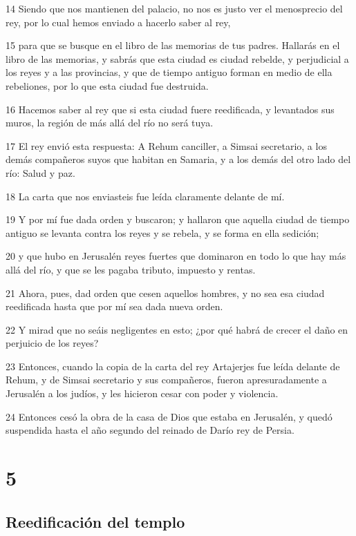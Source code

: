 \par 14 Siendo que nos mantienen del palacio, no nos es justo ver el menosprecio del rey, por lo cual hemos enviado a hacerlo saber al rey,
\par 15 para que se busque en el libro de las memorias de tus padres. Hallarás en el libro de las memorias, y sabrás que esta ciudad es ciudad rebelde, y perjudicial a los reyes y a las provincias, y que de tiempo antiguo forman en medio de ella rebeliones, por lo que esta ciudad fue destruida.
\par 16 Hacemos saber al rey que si esta ciudad fuere reedificada, y levantados sus muros, la región de más allá del río no será tuya. 
\par 17 El rey envió esta respuesta: A Rehum canciller, a Simsai secretario, a los demás compañeros suyos que habitan en Samaria, y a los demás del otro lado del río: Salud y paz.
\par 18 La carta que nos enviasteis fue leída claramente delante de mí.
\par 19 Y por mí fue dada orden y buscaron; y hallaron que aquella ciudad de tiempo antiguo se levanta contra los reyes y se rebela, y se forma en ella sedición;
\par 20 y que hubo en Jerusalén reyes fuertes que dominaron en todo lo que hay más allá del río, y que se les pagaba tributo, impuesto y rentas.
\par 21 Ahora, pues, dad orden que cesen aquellos hombres, y no sea esa ciudad reedificada hasta que por mí sea dada nueva orden.
\par 22 Y mirad que no seáis negligentes en esto; ¿por qué habrá de crecer el daño en perjuicio de los reyes?
\par 23 Entonces, cuando la copia de la carta del rey Artajerjes fue leída delante de Rehum, y de Simsai secretario y sus compañeros, fueron apresuradamente a Jerusalén a los judíos, y les hicieron cesar con poder y violencia.
\par 24 Entonces cesó la obra de la casa de Dios que estaba en Jerusalén, y quedó suspendida hasta el año segundo del reinado de Darío rey de Persia.

\chapter{5}

\section*{Reedificación del templo}

